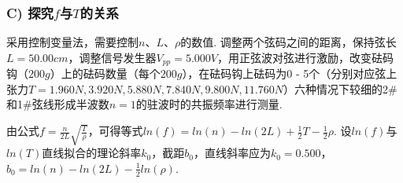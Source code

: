 \documentclass[UTF8]{ctexart}
\begin{document}
\subsubsection*{C) 探究$f$与$T$的关系}
采用控制变量法，需要控制$n$、$L$、$\rho$的数值. 调整两个弦码之间的距离，保持弦长$L = 50.00cm$，调整信号发生器$V_{pp} = 5.000V$，用正弦波对弦进行激励，改变砝码钩（$200g$）上的砝码数量（每个$200g$），在砝码钩上砝码为0 - 5个（分别对应弦上张力$T=1.960N, 3.920N, 5.880N, 7.840N, 9.800N, 11.760N$）六种情况下较细的2\#和1\#弦线形成半波数$n = 1$的驻波时的共振频率进行测量.\par
由公式${f = \frac{n}{2L}\sqrt{\frac{T}{\rho}}}$，可得等式$ln(f)=ln(n)-ln(2L)+\frac{1}{2}T-\frac{1}{2}\rho$. 设$ln(f)$与$ln(T)$直线拟合的理论斜率$k_0$，截距$b_0$，直线斜率应为$k_0=0.500$，$b_0=ln(n)-ln(2L)-\frac{1}{2}ln(\rho)$.
\end{document}
